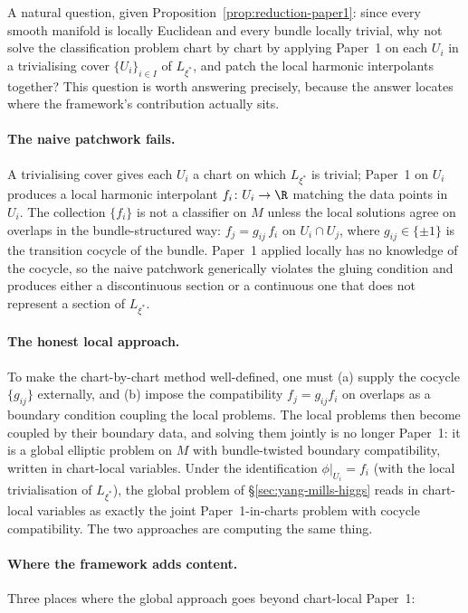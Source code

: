 \begin{remark}
\label{rem:local-vs-global}
A natural question, given Proposition~\ref{prop:reduction-paper1}:
since every smooth manifold is locally Euclidean and every bundle
locally trivial, why not solve the classification problem chart by
chart by applying Paper~1 on each $U_i$ in a trivialising cover
$\{U_i\}_{i\in I}$ of $L_{\xi^*}$, and patch the local harmonic
interpolants together? This question is worth answering precisely,
because the answer locates where the framework's contribution
actually sits.

\paragraph{The naive patchwork fails.} A trivialising cover gives
each $U_i$ a chart on which $L_{\xi^*}$ is trivial; Paper~1 on $U_i$
produces a local harmonic interpolant
$f_i\colon U_i\to\R$ matching the data points in $U_i$. The
collection $\{f_i\}$ is not a classifier on $M$ unless the local
solutions agree on overlaps in the bundle-structured way:
$f_j=g_{ij}\,f_i$ on $U_i\cap U_j$, where
$g_{ij}\in\{\pm 1\}$ is the transition cocycle of the bundle.
Paper~1 applied locally has no knowledge of the cocycle, so the
naive patchwork generically violates the gluing condition and
produces either a discontinuous section or a continuous one that
does not represent a section of $L_{\xi^*}$.

\paragraph{The honest local approach.} To make the chart-by-chart
method well-defined, one must (a) supply the cocycle $\{g_{ij}\}$
externally, and (b) impose the compatibility $f_j=g_{ij}f_i$ on
overlaps as a boundary condition coupling the local problems. The
local problems then become coupled by their boundary data, and
solving them jointly is no longer Paper~1: it is a global elliptic
problem on $M$ with bundle-twisted boundary compatibility, written
in chart-local variables. Under the identification $\phi|_{U_i}=f_i$
(with the local trivialisation of $L_{\xi^*}$), the global problem
of \S\ref{sec:yang-mills-higgs} reads in chart-local variables as
exactly the joint Paper~1-in-charts problem with cocycle
compatibility. The two approaches are computing the same thing.

\paragraph{Where the framework adds content.} Three places where
the global approach goes beyond chart-local Paper~1:


\end{remark}
